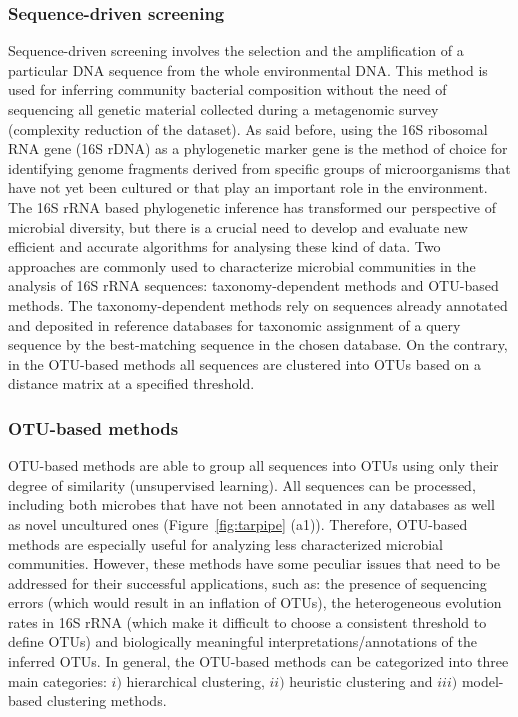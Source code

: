 \subsubsection{Sequence-driven screening \label{par:seqdriven}}
Sequence-driven screening involves the selection and the amplification of a particular DNA sequence from the whole environmental DNA. This method is used for inferring community bacterial composition without the need of sequencing all genetic material collected during a metagenomic survey (complexity reduction of the dataset). As said before, using the 16S ribosomal RNA gene (16S rDNA) as a phylogenetic marker gene is the method of choice for identifying genome fragments derived from specific groups of microorganisms that have not yet been cultured or that play an important role in the environment. The 16S rRNA based phylogenetic inference has transformed our perspective of microbial diversity, but there is a crucial need to develop and evaluate new efficient and accurate algorithms for analysing these kind of data. Two approaches are commonly used to characterize microbial communities in the analysis of 16S rRNA sequences: taxonomy-dependent methods and OTU-based methods. The taxonomy-dependent methods rely on sequences already annotated and deposited in reference databases for taxonomic assignment of a query sequence by the best-matching sequence in the chosen database. On the contrary, in the OTU-based methods all sequences are clustered into OTUs based on a distance matrix at a specified threshold.\\

\subsubsection*{OTU-based methods \label{par:otumet}}
OTU-based methods are able to group all sequences into OTUs using only their degree of similarity (unsupervised learning). All sequences can be processed, including both microbes that have not been annotated in any databases as well as novel uncultured ones (Figure~\ref{fig:tarpipe} (a1)). Therefore, OTU-based methods are especially useful for analyzing less characterized microbial communities. However, these methods have some peculiar issues that need to be addressed for their successful applications, such as: the presence of sequencing errors (which would result in an inflation of OTUs), the heterogeneous evolution rates in 16S rRNA (which make it difficult to choose a consistent threshold to define OTUs) and biologically meaningful interpretations/annotations of the inferred OTUs. In general, the OTU-based methods can be categorized into three main categories: $i)$ hierarchical clustering, $ii)$ heuristic clustering and $iii)$ model-based clustering methods.

